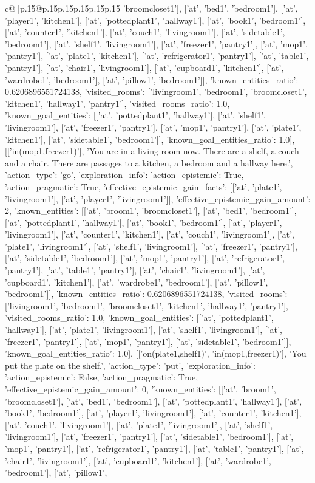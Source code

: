 \documentclass{article}
\begin{document}
{\begin{supertabular}{c@{$\;$}|p{.15\linewidth}@{}p{.15\linewidth}p{.15\linewidth}p{.15\linewidth}p{.15\linewidth}p{.15\linewidth}}
{{{'broomcloset1'], ['at', 'bed1', 'bedroom1'], ['at', 'player1', 'kitchen1'], ['at', 'pottedplant1', 'hallway1'], ['at', 'book1', 'bedroom1'], ['at', 'counter1', 'kitchen1'], ['at', 'couch1', 'livingroom1'], ['at', 'sidetable1', 'bedroom1'], ['at', 'shelf1', 'livingroom1'], ['at', 'freezer1', 'pantry1'], ['at', 'mop1', 'pantry1'], ['at', 'plate1', 'kitchen1'], ['at', 'refrigerator1', 'pantry1'], ['at', 'table1', 'pantry1'], ['at', 'chair1', 'livingroom1'], ['at', 'cupboard1', 'kitchen1'], ['at', 'wardrobe1', 'bedroom1'], ['at', 'pillow1', 'bedroom1']], 'known_entities_ratio': 0.6206896551724138, 'visited_rooms': ['livingroom1', 'bedroom1', 'broomcloset1', 'kitchen1', 'hallway1', 'pantry1'], 'visited_rooms_ratio': 1.0, 'known_goal_entities': [['at', 'pottedplant1', 'hallway1'], ['at', 'shelf1', 'livingroom1'], ['at', 'freezer1', 'pantry1'], ['at', 'mop1', 'pantry1'], ['at', 'plate1', 'kitchen1'], ['at', 'sidetable1', 'bedroom1']], 'known_goal_entities_ratio': 1.0}}], [['in(mop1,freezer1)'], 'You are in a living room now. There are a shelf, a couch and a chair. There are passages to a kitchen, a bedroom and a hallway here.', {'action_type': 'go', 'exploration_info': {'action_epistemic': True, 'action_pragmatic': True, 'effective_epistemic_gain_facts': [['at', 'plate1', 'livingroom1'], ['at', 'player1', 'livingroom1']], 'effective_epistemic_gain_amount': 2, 'known_entities': [['at', 'broom1', 'broomcloset1'], ['at', 'bed1', 'bedroom1'], ['at', 'pottedplant1', 'hallway1'], ['at', 'book1', 'bedroom1'], ['at', 'player1', 'livingroom1'], ['at', 'counter1', 'kitchen1'], ['at', 'couch1', 'livingroom1'], ['at', 'plate1', 'livingroom1'], ['at', 'shelf1', 'livingroom1'], ['at', 'freezer1', 'pantry1'], ['at', 'sidetable1', 'bedroom1'], ['at', 'mop1', 'pantry1'], ['at', 'refrigerator1', 'pantry1'], ['at', 'table1', 'pantry1'], ['at', 'chair1', 'livingroom1'], ['at', 'cupboard1', 'kitchen1'], ['at', 'wardrobe1', 'bedroom1'], ['at', 'pillow1', 'bedroom1']], 'known_entities_ratio': 0.6206896551724138, 'visited_rooms': ['livingroom1', 'bedroom1', 'broomcloset1', 'kitchen1', 'hallway1', 'pantry1'], 'visited_rooms_ratio': 1.0, 'known_goal_entities': [['at', 'pottedplant1', 'hallway1'], ['at', 'plate1', 'livingroom1'], ['at', 'shelf1', 'livingroom1'], ['at', 'freezer1', 'pantry1'], ['at', 'mop1', 'pantry1'], ['at', 'sidetable1', 'bedroom1']], 'known_goal_entities_ratio': 1.0}}], [['on(plate1,shelf1)', 'in(mop1,freezer1)'], 'You put the plate on the shelf.', {'action_type': 'put', 'exploration_info': {'action_epistemic': False, 'action_pragmatic': True, 'effective_epistemic_gain_amount': 0, 'known_entities': [['at', 'broom1', 'broomcloset1'], ['at', 'bed1', 'bedroom1'], ['at', 'pottedplant1', 'hallway1'], ['at', 'book1', 'bedroom1'], ['at', 'player1', 'livingroom1'], ['at', 'counter1', 'kitchen1'], ['at', 'couch1', 'livingroom1'], ['at', 'plate1', 'livingroom1'], ['at', 'shelf1', 'livingroom1'], ['at', 'freezer1', 'pantry1'], ['at', 'sidetable1', 'bedroom1'], ['at', 'mop1', 'pantry1'], ['at', 'refrigerator1', 'pantry1'], ['at', 'table1', 'pantry1'], ['at', 'chair1', 'livingroom1'], ['at', 'cupboard1', 'kitchen1'], ['at', 'wardrobe1', 'bedroom1'], ['at', 'pillow1', }}}
\end{supertabular}}
\end{document}

